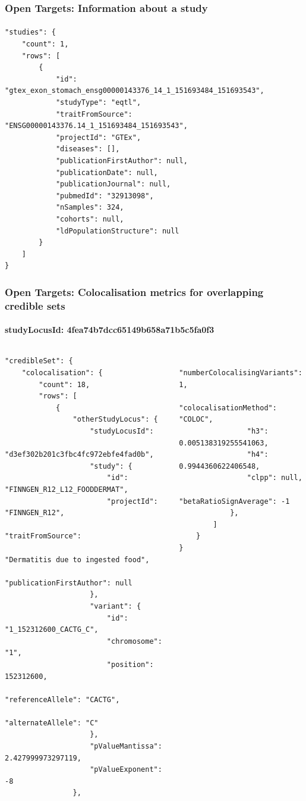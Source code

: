 \documentclass[aspectratio=169,xcolor=dvipsnames]{beamer}
\begin{document}
\begin{frame}[fragile,t]
  \frametitle{Open Targets: Information about a study}
  \framesubtitle{}
  \tiny
\begin{verbatim}
"studies": {
    "count": 1,
    "rows": [
        {
            "id": "gtex_exon_stomach_ensg00000143376_14_1_151693484_151693543",
            "studyType": "eqtl",
            "traitFromSource": "ENSG00000143376.14_1_151693484_151693543",
            "projectId": "GTEx",
            "diseases": [],
            "publicationFirstAuthor": null,
            "publicationDate": null,
            "publicationJournal": null,
            "pubmedId": "32913098",
            "nSamples": 324,
            "cohorts": null,
            "ldPopulationStructure": null
        }
    ]
}
\end{verbatim}
\end{frame}

\begin{frame}[fragile,t]
  \frametitle{Open Targets: Colocalisation metrics for overlapping credible sets}
  \framesubtitle{studyLocusId: 4fea74b7dcc65149b658a71b5c5fa0f3}
  \tiny
  \begin{columns}[t]
    \begin{column}{0.5\textwidth}
\begin{verbatim}
"credibleSet": {
    "colocalisation": {
        "count": 18,
        "rows": [
            {
                "otherStudyLocus": {
                    "studyLocusId":
                        "d3ef302b201c3fbc4fc972ebfe4fad0b",
                    "study": {
                        "id": "FINNGEN_R12_L12_FOODDERMAT",
                        "projectId": "FINNGEN_R12",
                        "traitFromSource":
                            "Dermatitis due to ingested food",
                        "publicationFirstAuthor": null
                    },
                    "variant": {
                        "id": "1_152312600_CACTG_C",
                        "chromosome": "1",
                        "position": 152312600,
                        "referenceAllele": "CACTG",
                        "alternateAllele": "C"
                    },
                    "pValueMantissa": 2.427999973297119,
                    "pValueExponent": -8
                },
\end{verbatim}
    \end{column}
    \begin{column}{0.5\textwidth}
\begin{verbatim}
                "numberColocalisingVariants": 1,
                "colocalisationMethod": "COLOC",
                "h3": 0.005138319255541063,
                "h4": 0.9944360622406548,
                "clpp": null,
                "betaRatioSignAverage": -1
            },
        ]
    }
}
\end{verbatim}
    \end{column}
  \end{columns}
\end{frame}
\end{document}
